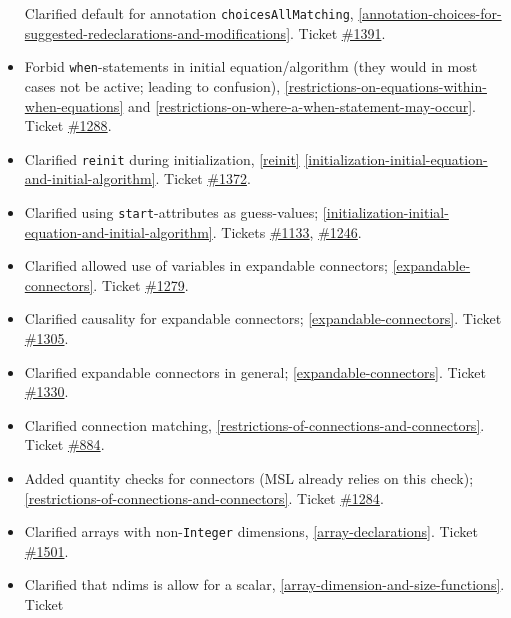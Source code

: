 \begin{itemize}
  Clarified default for annotation \lstinline!choicesAllMatching!, \cref{annotation-choices-for-suggested-redeclarations-and-modifications}.
  Ticket \href{https://github.com/modelica/ModelicaSpecification/issues/1391}{\#1391}.
\item
  Forbid \lstinline!when!-statements in initial equation/algorithm (they would in most cases not be active; leading to confusion), \cref{restrictions-on-equations-within-when-equations} and \cref{restrictions-on-where-a-when-statement-may-occur}.
  Ticket \href{https://github.com/modelica/ModelicaSpecification/issues/1288}{\#1288}.
\item
  Clarified \lstinline!reinit! during initialization, \cref{reinit} \cref{initialization-initial-equation-and-initial-algorithm}.
  Ticket \href{https://github.com/modelica/ModelicaSpecification/issues/1372}{\#1372}.
\item
  Clarified using \lstinline!start!-attributes as guess-values; \cref{initialization-initial-equation-and-initial-algorithm}.
  Tickets \href{https://github.com/modelica/ModelicaSpecification/issues/1133}{\#1133}, \href{https://github.com/modelica/ModelicaSpecification/issues/1246}{\#1246}.
\item
  Clarified allowed use of variables in expandable connectors; \cref{expandable-connectors}. Ticket
  \href{https://github.com/modelica/ModelicaSpecification/issues/1279}{\#1279}.
\item
  Clarified causality for expandable connectors; \cref{expandable-connectors}. Ticket
  \href{https://github.com/modelica/ModelicaSpecification/issues/1305}{\#1305}.
\item
  Clarified expandable connectors in general; \cref{expandable-connectors}. Ticket
  \href{https://github.com/modelica/ModelicaSpecification/issues/1330}{\#1330}.
\item
  Clarified connection matching, \cref{restrictions-of-connections-and-connectors}. Ticket
  \href{https://github.com/modelica/ModelicaSpecification/issues/884}{\#884}.
\item
  Added quantity checks for connectors (MSL already relies on this
  check); \cref{restrictions-of-connections-and-connectors}. Ticket
  \href{https://github.com/modelica/ModelicaSpecification/issues/1284}{\#1284}.
\item
  Clarified arrays with non-\lstinline!Integer! dimensions, \cref{array-declarations}.
  Ticket \href{https://github.com/modelica/ModelicaSpecification/issues/1501}{\#1501}.
\item
  Clarified that ndims is allow for a scalar, \cref{array-dimension-and-size-functions}. Ticket

\end{itemize}
